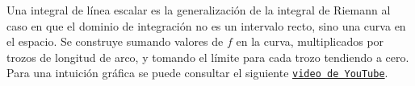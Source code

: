 Una integral de línea escalar es la generalización de la integral de Riemann al caso en que el dominio de integración no es un intervalo recto, sino una curva en el espacio. Se construye sumando valores de $f$ en la curva, multiplicados por trozos de longitud de arco, y tomando el límite para cada trozo tendiendo a cero. Para una intuición gráfica se puede consultar el siguiente \href{https://www.youtube.com/watch?v=wCphv9dCswg}{\texttt{video de YouTube}}.























